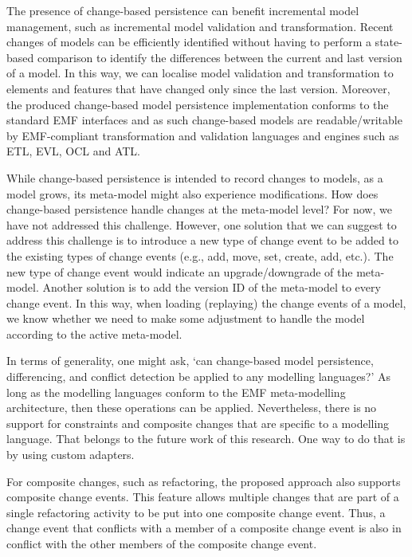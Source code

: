 The presence of change-based persistence can benefit incremental model management, such as incremental model validation and transformation. Recent changes of models can be efficiently identified without having to perform a state-based comparison to identify the differences between the current and last version of a model. In this way, we can localise model validation and transformation to elements and features that have changed only since the last version. Moreover, the produced change-based model persistence implementation conforms to the standard EMF interfaces and as such change-based models are readable/writable by EMF-compliant transformation and validation languages and engines such as ETL, EVL, OCL and ATL.

While change-based persistence is intended to record changes to models, as a model grows, its meta-model might also experience modifications. How does change-based persistence handle changes at the meta-model level? For now, we have not addressed this challenge. However, one solution that we can suggest to address this challenge is to introduce a new type of change event to be added to the existing types of change events (e.g., add, move, set, create, add, etc.). The new type of change event would indicate an upgrade/downgrade of the meta-model. Another solution is to add the version ID of the meta-model to every change event. In this way, when loading (replaying) the change events of a model, we know whether we need to make some adjustment to handle the model according to the active meta-model.

In terms of generality, one might ask, ‘can change-based model persistence, differencing, and conflict detection be applied to any modelling languages?’ As long as the modelling languages conform to the EMF meta-modelling architecture, then these operations can be applied. Nevertheless, there is no support for constraints and composite changes that are specific to a modelling language. That belongs to the future work of this research. One way to do that is by using custom adapters.

For composite changes, such as refactoring, the proposed approach also supports composite change events. This feature allows multiple changes that are part of a single refactoring activity to be put into one composite change event. Thus, a change event that conflicts with a member of a composite change event is also in conflict with the other members of the composite change event.


